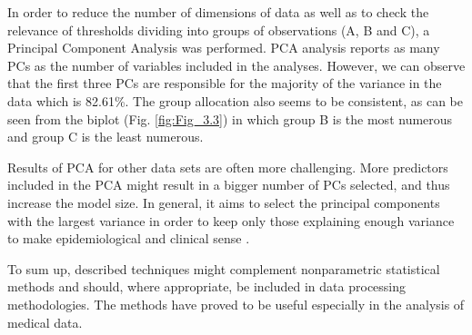 \documentclass[12pt,a4paper,notitlepage]{report}
\begin{document}
In order to reduce the number of dimensions of data as well as to check the relevance of thresholds dividing into groups of observations (A, B and C), a Principal Component Analysis was performed. PCA analysis reports as many PCs as the number of variables included in the analyses. However, we can observe that the first three PCs are responsible for the majority of the variance in the data which is 82.61\%. 
The group allocation also seems to be consistent, as can be seen from the biplot (Fig. \ref{fig:Fig_3.3}) in which group B is the most numerous and group C is the least numerous.

Results of PCA for other data sets are often more challenging. More predictors included in the PCA might result in a bigger number of PCs selected, and thus increase the model size. In general, it aims to select the principal components with the largest variance in order to keep only those explaining enough variance to make epidemiological and clinical sense \cite{Zhang17}.

To sum up, described techniques might complement  nonparametric statistical methods and should, where appropriate, be included in data processing methodologies. The methods have proved to be useful especially in the analysis of medical data.


\end{document}
